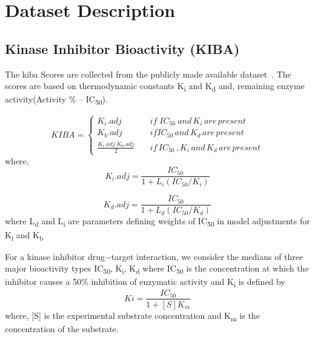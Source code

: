 \section{Dataset Description}

\iffalse
\subsection{\acrfull{kegg}}
\acrfull{kegg} is a community-driven database which contains large-scale molecular datasets generated by genome sequencing and high-throughput experimental techniuqe.\cite{Kanehisa2000, ozturk2018deepdta} We use \acrshort{kegg} DRUG dataset for finding the interaction set between DRUG and PROTEIN. The interaction score is :
\fi

\subsection{Kinase Inhibitor Bioactivity (KIBA)}
The \acrfull{kiba} Scores are collected from the publicly made available dataset~\cite{Tang2013}. The scores are based on thermodynamic constants K\textsubscript{i} and K\textsubscript{d} and, remaining enzyme activity(Activity \% --  IC\textsubscript{50}).

\begin{equation}
  KIBA = \begin{cases}
    K_i . {adj} & \quad {if} \; {IC_{50}\: and\, K_i \,are\, present} \\
    K_b.{adj} & \quad {if}  {IC_{50} \, and \, K_d \, are \, present} \\
    \frac{K_i . {adj} \; K_b.{adj}}{2} & \quad {if\, IC_{50}\,,K_i\, and \,K_d\, are\, present}
  \end{cases}
   \label{eq:kiba}
\end{equation}
where,
\begin{equation}
K_i.{adj} = \frac{IC_{50}}{1 + L_i(IC_{50}/K_i)}
\label{eq:ki_adj}
\end{equation}

\begin{equation}
K_d.{adj} = \frac{IC_{50}}{1 + L_d(IC_{50}/K_d)}
\end{equation}
where L\textsubscript{d} and L\textsubscript{i} are parameters defining weights of IC\textsubscript{50} in model adjustments for K\textsubscript{i} and K\textsubscript{b} 

For a kinase inhibitor drug−target interaction, we consider the medians of three major bioactivity types IC\textsubscript{50}, K\textsubscript{i}, K\textsubscript{d} where
IC\textsubscript{50} \cite{Tang2013} is the concentration at which the inhibitor causes a 50\% inhibition of enzymatic activity and K\textsubscript{i} is defined by \begin{equation}
    Ki = \frac{IC_{50}} {1 + [S]  K_m}
    \label{eq:ki}
\end{equation} 
where,  [{S}] is the experimental substrate concentration and K\textsubscript{m} is the concentration of the substrate.

